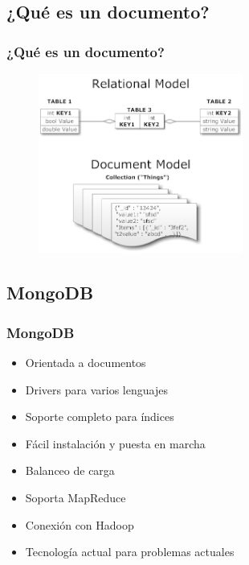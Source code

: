 \documentclass[serif,12pt]{beamer}
\begin{document}
\subsection{¿Qué es un documento?}
\begin{frame}
\frametitle{¿Qué es un documento?}

\begin{figure}
\centering
\includegraphics[width=0.6\textwidth, height=0.6\textheight]{images/document_vs_tables.png} 
\label{fig:document_vs_tables}
\end{figure}

\end{frame}

\subsection{MongoDB}
\begin{frame}
\frametitle{MongoDB}

\begin{itemize}
\item Orientada a documentos
\item Drivers para varios lenguajes
\item Soporte completo para índices
\item Fácil instalación y puesta en marcha
\item Balanceo de carga
\item Soporta MapReduce
\item Conexión con Hadoop
\item Tecnología actual para problemas actuales
\end{itemize}

\end{frame}
\end{document}
